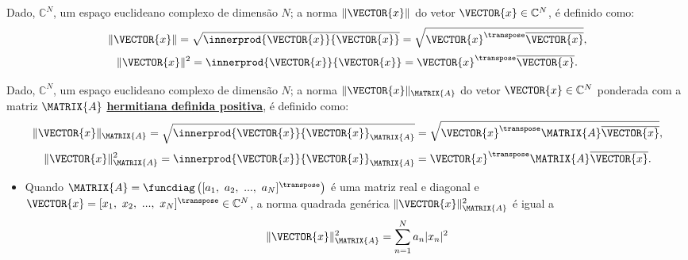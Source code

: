 \begin{definition}
Dado, $\mathbb{C}^N$, um espaço euclideano complexo de dimensão $N$;
a norma  $\|\VECTOR{x}\|$ do vetor $\VECTOR{x}\in \mathbb{C}^N$,
é definido como:
\begin{equation}
\|\VECTOR{x}\|=\sqrt{\innerprod{\VECTOR{x}}{\VECTOR{x}}}
=\sqrt{\VECTOR{x}^{\transpose} \overline{\VECTOR{x}}}
,
\end{equation} 
\begin{equation}
\|\VECTOR{x}\|^2=\innerprod{\VECTOR{x}}{\VECTOR{x}}
=\VECTOR{x}^{\transpose} \overline{\VECTOR{x}}
.
\end{equation} 
\end{definition}

\begin{definition}
Dado, $\mathbb{C}^N$, um espaço euclideano complexo de dimensão $N$;
a norma  $\|\VECTOR{x}\|_{\MATRIX{A}}$ do vetor $\VECTOR{x}\in \mathbb{C}^N$
ponderada com a matriz $\MATRIX{A}$ \hyperref[def:hermitianapositivematrix0]{\textbf{hermitiana definida positiva}},
é definido como:
\vspace{-10pt}
\begin{equation}
\|\VECTOR{x}\|_{\MATRIX{A}}=\sqrt{\innerprod{\VECTOR{x}}{\VECTOR{x}}_{\MATRIX{A}}}
=\sqrt{\VECTOR{x}^{\transpose}\MATRIX{A} \overline{\VECTOR{x}}}
,
\end{equation} 
\begin{equation}
\|\VECTOR{x}\|_{\MATRIX{A}}^2=\innerprod{\VECTOR{x}}{\VECTOR{x}}_{\MATRIX{A}}
=\VECTOR{x}^{\transpose}\MATRIX{A} \overline{\VECTOR{x}}
.
\end{equation} 
\end{definition}

\begin{tcbattention}
\begin{itemize}
\item Quando $\MATRIX{A}=\funcdiag\left([a_1,~a_2,~...,~a_N]^{\transpose}\right)$ 
é uma matriz real e diagonal e
$\VECTOR{x}=[x_1,~x_2,~...,~x_N]^{\transpose} \in \mathbb{C}^N$, 
a norma quadrada genérica $\|\VECTOR{x}\|_{\MATRIX{A}}^2$ é igual a
\vspace{-10pt}
\begin{equation}
\|\VECTOR{x}\|_{\MATRIX{A}}^2=\sum_{n=1}^{N} a_{n}|x_n|^2
\end{equation}
\end{itemize}
\end{tcbattention}

